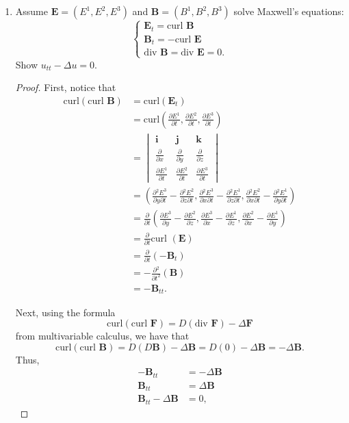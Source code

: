 \documentclass[11pt,oneside,english]{amsart}
\theoremstyle{definition}
\newcommand{\pp}[2]{\frac{\partial{#1}}{\partial{#2}}}
\begin{document}
\begin{enumerate}
\pagebreak

\item Assume $\mathbf{E}=(E^1,E^2,E^3)$ and $\mathbf{B}=(B^1,B^2,B^3)$ solve Maxwell's equations:
\[
\begin{cases}\mathbf{E}_t=\text{curl }\mathbf{B}\\ \mathbf{B}_t=-\text{curl }\mathbf{E}\\ \text{div }\mathbf{B}=\text{div }\mathbf{E}=0.\end{cases}
\]
Show $u_{tt}-\Delta u=0$.

\begin{proof}

First, notice that
\begin{align*}
\text{curl}(\text{curl }\textbf{B})&=\text{curl}(\mathbf{E}_t)\\[2mm]
&=\text{curl}\left(\pp{E^1}{t},\pp{E^2}{t},\pp{E^3}{t}\right)\\[2mm]
&=\begin{vmatrix}\mathbf{i} & \mathbf{j} & \mathbf{k} \\ \pp{}{x} & \pp{}{y} & \pp{}{z} \\ \pp{E^1}{t} & \pp{E^2}{t} & \pp{E^3}{t}\end{vmatrix}\\[2mm]
&=\left(\pp{^2E^3}{y\partial t}-\pp{^2E^2}{z\partial t},\pp{^2E^3}{x\partial t}-\pp{^2E^1}{z\partial t},\pp{^2E^2}{x\partial t}-\pp{^2E^1}{y\partial t}\right)\\[2mm]
&=\pp{}{t}\left(\pp{E^3}{y}-\pp{E^2}{z},\pp{E^3}{x}-\pp{E^1}{z},\pp{E^2}{x}-\pp{E^1}{y}\right)\\[2mm]
&=\pp{}{t}\text{curl }(\mathbf{E})\\[2mm]
&=\pp{}{t}(-\mathbf{B}_t)\\[2mm]
&=-\pp{^2}{t^2}(\mathbf{B})\\[2mm]
&=-\mathbf{B}_{tt}.
\end{align*}

Next, using the formula 
\[
\text{curl}(\text{curl }\mathbf{F})=D(\text{div }\mathbf{F})-\Delta\mathbf{F}
\]
from multivariable calculus, we have that
\[
\text{curl}(\text{curl }\mathbf{B})=D(D\mathbf{B})-\Delta \mathbf{B}=D(0)-\Delta\mathbf{B}=-\Delta\mathbf{B}.
\]
Thus,
\begin{align*}
-\mathbf{B}_{tt}&=-\Delta \mathbf{B}\\[2mm]
\mathbf{B}_{tt}&=\Delta \mathbf{B}\\[2mm]
\mathbf{B}_{tt}-\Delta \mathbf{B}&=0,
\end{align*}


\end{proof}
\end{enumerate}
\end{document}

